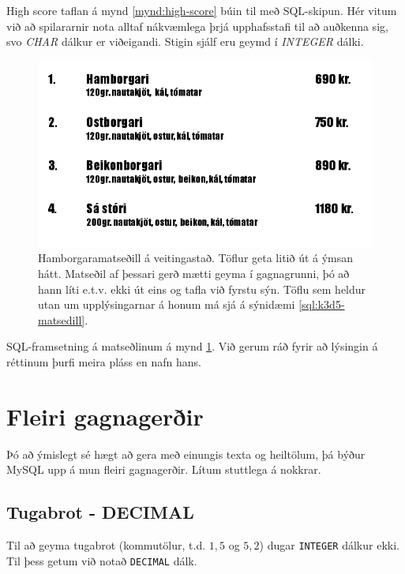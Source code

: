 \begin{example}
\caption[High Score tafla]{High score taflan á mynd \ref{mynd:high-score} búin til með SQL-skipun. Hér vitum við að spilararnir nota alltaf nákvæmlega þrjá upphafsstafi til að auðkenna sig, svo \emph{CHAR} dálkur er viðeigandi. Stigin sjálf eru geymd í \emph{INTEGER} dálki.}
\label{sql:k3d4-high-score}
\centering
{}
\end{example}

\begin{figure}
\caption[Matseðill]{Hamborgaramatseðill á veitingastað. Töflur geta litið út á ýmsan hátt. Matseðil af þessari gerð mætti geyma í gagnagrunni, þó að hann líti e.t.v. ekki út eins og tafla við fyrstu sýn. Töflu sem heldur utan um upplýsingarnar á honum má sjá á sýnidæmi \ref{sql:k3d5-matsedill}. }
\label{mynd:matsedill}
\includegraphics[width=\textwidth]{myndir/matsedill}
\end{figure}

\begin{example}
\caption[Matseðill]{SQL-framsetning á matseðlinum á mynd \ref{mynd:matsedill}. Við gerum ráð fyrir að lýsingin á réttinum þurfi meira pláss en nafn hans.}
\label{sql:k3d5-matsedill}
\centering
{}
\end{example}

\section{Fleiri gagnagerðir}
Þó að ýmislegt sé hægt að gera með einungis texta og heiltölum, þá býður MySQL upp á mun fleiri gagnagerðir. Lítum stuttlega á nokkrar.
\subsection{Tugabrot - DECIMAL}
Til að geyma tugabrot (kommutölur, t.d. $1,5$ og $5,2$) dugar \verb|INTEGER| dálkur ekki. Til þess getum við notað \verb|DECIMAL| dálk.

